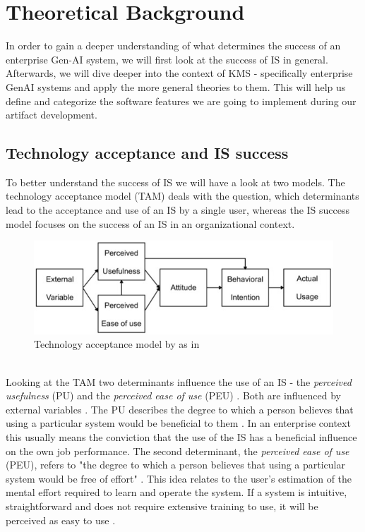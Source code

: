 \documentclass[
	english,
	ruledheaders=section,%
	class=report,%
	thesis={type=bachelor},%
	accentcolor=1b,%
	custommargins=true,%
	marginpar=false,%
	parskip=half-,%
	fontsize=11pt,%
	DIV=14,
]{tudapub}
\begin{document}
\chapter{Theoretical Background}
In order to gain a deeper understanding of what determines the success of an enterprise Gen-AI system, we will first look at the success of IS in general. Afterwards, we will dive deeper into the context of KMS - specifically enterprise GenAI systems and apply the more general theories to them. This will help us define and categorize the software features we are going to implement during our artifact development.
\section{Technology acceptance and IS success}
To better understand the success of IS we will have a look at two models. The technology acceptance model (TAM) \parencite{Davis1989} deals with the question, which determinants lead to the acceptance and use of an IS by a single user, whereas the IS success model \parencite{DeloneMcLean2003ISSuccessTenYearUpdate} focuses on the success of an IS in an organizational context.
\begin{figure}[h!]
    \includegraphics[width=1\linewidth]{images/TAM.png}
    \caption{Technology acceptance model by \parencite{Davis1989} as in \parencite[p.~61]{Ma2004}}
    \label{fig:enter-label}
\end{figure}
\\
Looking at the TAM two determinants influence the use of an IS - the \textit{perceived usefulness} (PU) and the \textit{perceived ease of use} (PEU) \parencite[p.~320]{Davis1989}. Both are influenced by external variables \parencite[p.~335]{Davis1989}. The PU describes the degree to which a person believes that using a particular system would be beneficial to them \parencite[p.~320]{Davis1989}. In an enterprise context this usually means the conviction that the use of the IS has a beneficial influence on the own job performance. The second determinant, the \textit{perceived ease of use} (PEU), refers to "the degree to which a person believes that using a particular system would be free of effort" \parencite[p.~320]{Davis1989}. This idea relates to the user's estimation of the mental effort required to learn and operate the system. If a system is intuitive, straightforward and does not require extensive training to use, it will be perceived as easy to use \parencite[pp.~324-325]{Davis1989}.\\
\end{document}
